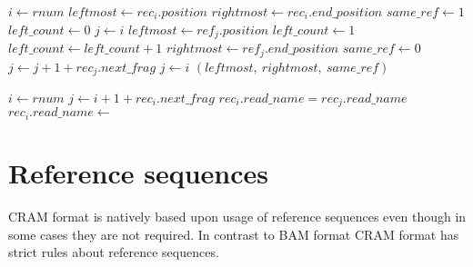\documentclass[a4paper]{article}
\makeatletter
\newcommand*{\bitand}{%
  \nonscript\mskip-\medmuskip\mkern5mu%
  \mathbin{\operator@font AND}\penalty900\mkern5mu%
  \nonscript\mskip-\medmuskip
}
\makeatother
\begin{document}
\begin{algorithmic}[1]
  \State $i \gets rnum$
  \State $leftmost \gets rec_i.position$
  \State $rightmost \gets rec_i.end\_position$
  \State $same\_ref \gets 1$
  \State $left\_count \gets 0$
  \State $j \gets i$
  \Repeat
      \State $leftmost \gets ref_j.position$
      \State $left\_count \gets 1$
      \State $left\_count \gets left\_count + 1$
    \EndIf
      \State $rightmost \gets ref_j.end\_position$
    \EndIf
      \State $same\_ref \gets 0$
    \EndIf
      \State $j \gets j + 1 + rec_j.next\_frag$
    \Else
      \State $j \gets i$
    \EndIf
  \Return $(leftmost,\ rightmost, \ same\_ref)$
\EndFunction
\end{algorithmic}

\begin{algorithmic}[1]
  \State $i \gets rnum$
    \If{$rec_i.cram\_flag \bitand 4$}
       \State $j \gets i + 1 + rec_i.next\_frag$
       \State $rec_i.read\_name = rec_j.read\_name$
    \EndIf
  \EndIf
    \State $rec_i.read\_name \gets$ 
  \EndIf
\EndProcedure
\end{algorithmic}

\section{Reference sequences}

CRAM format is natively based upon usage of reference sequences even though in 
some cases they are not required. In contrast to BAM format CRAM format has strict 
rules about reference sequences. 
\end{document}
